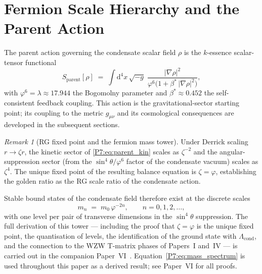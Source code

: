 \documentclass[11pt,a4paper]{article}
\theoremstyle{definition}
\theoremstyle{remark}
\newtheorem{remark}[theorem]{Remark}
\newcommand{\vp}{\varphi}
\newcommand{\bst}{\beta^{*}}
\newcommand{\lam}{\lambda}
\newcommand{\Lcond}{\Lambda_{\mathrm{cond}}}
\begin{document}
\section{Fermion Scale Hierarchy and the Parent Action}
\label{P7:sec:rg}

The parent action governing the condensate scalar field $\rho$ is the
$k$-essence scalar-tensor functional~\cite{Paper1}
\begin{equation}
  S_{\mathrm{parent}}[\rho]
  \;=\; \int\!\mathrm{d}^4x\,\sqrt{-g}\;
  \frac{|\nabla\rho|^2}{\vp^6\bigl(1 + \bst\,|\nabla\rho|^2\bigr)},
  \label{P7:eq:parent_kin}
\end{equation}
with $\vp^6 = \lam \approx 17.944$ the Bogomolny parameter and
$\bst \approx 0.452$ the self-consistent feedback coupling.
This action is the gravitational-sector starting point; its
coupling to the metric $g_{\mu\nu}$ and its cosmological consequences
are developed in the subsequent sections.

\begin{remark}[RG fixed point and the fermion mass tower]
\label{P7:rem:rg_tower}
Under Derrick scaling $r \to \zeta r$, the kinetic sector of
\eqref{P7:eq:parent_kin} scales as $\zeta^{-2}$ and the angular-suppression
sector (from the $\sin^4\!\theta/\vp^6$ factor of the condensate vacuum)
scales as $\zeta^4$.  The unique fixed point of the resulting balance
equation is $\zeta = \vp$, establishing the golden ratio as the
RG scale ratio of the condensate action.

Stable bound states of the condensate field therefore exist at the
discrete scales
\begin{equation}
  m_n \;=\; m_0\,\vp^{-2n}, \qquad n = 0, 1, 2, \ldots,
  \label{P7:eq:mass_spectrum}
\end{equation}
with one level per pair of transverse dimensions in the $\sin^4\!\theta$
suppression.  The full derivation of this tower --- including the proof
that $\zeta = \vp$ is the unique fixed point, the quantisation of levels,
the identification of the ground state with $\Lcond$, and the connection
to the WZW T-matrix phases of Papers~I and~IV --- is carried out in the
companion Paper~VI~\cite{Paper6}.
Equation~\eqref{P7:eq:mass_spectrum} is used throughout this paper as a
derived result; see Paper~VI for all proofs.
\end{remark}
\end{document}
